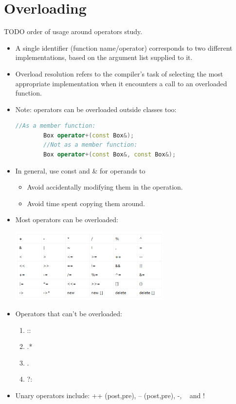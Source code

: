 \documentclass{report}
\begin{document}
\section{Overloading}
TODO order of usage around operators study.
\begin{itemize}
    \item A single identifier (function name/operator) corresponds to two different implementations, based on the argument list supplied to it.
    \item Overload resolution refers to the compiler's task of selecting the most appropriate implementation when it encounters a call to an overloaded function.
    \item Note: operators can be overloaded outside classes too:
    \begin{lstlisting}[language=C++]
        //As a member function:
        Box operator+(const Box&);
        //Not as a member function:
        Box operator+(const Box&, const Box&);
    \end{lstlisting}
    \item In general, use const and \& for operands to 
    \begin{itemize}
        \item Avoid accidentally modifying them in the operation.
        \item Avoid time spent copying them around.
    \end{itemize}
    \item Most operators can be overloaded:
    \begin{center}
        \includegraphics[width=8cm]{rsrc/overloadableops.png}
    \end{center}
    \item Operators that can't be overloaded:
    \begin{enumerate}
        \item ::
        \item .*
        \item .
        \item ?:
    \end{enumerate}
    \item Unary operators include: ++ (post,pre), -- (post,pre), -, ~ and !
\end{itemize}
\end{document}
